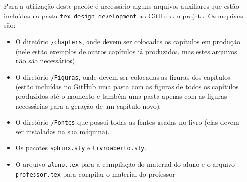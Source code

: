 


Para a utilização deste pacote é necessário alguns arquivos auxiliares que estão incluídos na pasta \verb|tex-design-development| no \href{https://github.com/livro-aberto/tex-design-development/}{GitHub} do projeto. Os arquivos são:
\begin{itemize}
\item O diretório \verb|/chapters|, onde devem ser colocados os capítulos em produção (nele estão exemplos de outros capítulos já produzidos, mas estes arquivos não são necessários).
\item O diretório \verb|/Figuras|, onde devem ser colocadas as figuras dos capítulos (estão incluídas no GitHub uma pasta com as figuras de todos os capítulos produzidos até o momento e também uma pasta apenas com as figuras necessárias para a geração de um capítulo novo).
\item O diretório \verb|/Fontes| que possui todas as fontes usadas no livro (elas devem ser instaladas na sua máquina).
\item Os pacotes \verb|sphinx.sty| e \verb|livroaberto.sty|.
\item O arquivo \verb|aluno.tex| para a compilação do material do aluno e o arquivo \verb|professor.tex| para compilar o material do professor.
\end{itemize}

